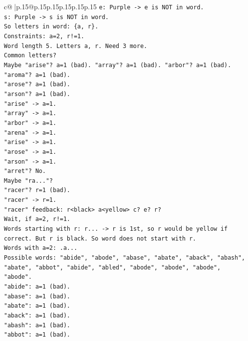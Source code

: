 \documentclass{article}
\begin{document}
{\begin{supertabular}{c@{$\;$}|p{.15\linewidth}@{}p{.15\linewidth}p{.15\linewidth}p{.15\linewidth}p{.15\linewidth}p{.15\linewidth}}
{{{\texttt{e: Purple {-}> e is NOT in word.} \\
\texttt{s: Purple {-}> s is NOT in word.} \\
\texttt{So letters in word: \{a, r\}.} \\
\texttt{Constraints: a=2, r!=1.} \\
\texttt{Word length 5. Letters a, r. Need 3 more.} \\
\texttt{Common letters?} \\
\texttt{Maybe "arise"? a=1 (bad). "array"? a=1 (bad). "arbor"? a=1 (bad).} \\
\texttt{"aroma"? a=1 (bad).} \\
\texttt{"arose"? a=1 (bad).} \\
\texttt{"arson"? a=1 (bad).} \\
\texttt{"arise" {-}> a=1.} \\
\texttt{"array" {-}> a=1.} \\
\texttt{"arbor" {-}> a=1.} \\
\texttt{"arena" {-}> a=1.} \\
\texttt{"arise" {-}> a=1.} \\
\texttt{"arose" {-}> a=1.} \\
\texttt{"arson" {-}> a=1.} \\
\texttt{"arret"? No.} \\
\texttt{Maybe "ra..."?} \\
\texttt{"racer"? r=1 (bad).} \\
\texttt{"racer" {-}> r=1.} \\
\texttt{"racer" feedback: r<black> a<yellow> c? e? r?} \\
\texttt{Wait, if a=2, r!=1.} \\
\texttt{Words starting with r: r... {-}> r is 1st, so r would be yellow if correct. But r is black. So word does not start with r.} \\
\texttt{Words with a=2: .a...} \\
\texttt{Possible words: "abide", "abode", "abase", "abate", "aback", "abash", "abate", "abbot", "abide", "abled", "abode", "abode", "abode", "abode".} \\
\texttt{"abide": a=1 (bad).} \\
\texttt{"abase": a=1 (bad).} \\
\texttt{"abate": a=1 (bad).} \\
\texttt{"aback": a=1 (bad).} \\
\texttt{"abash": a=1 (bad).} \\
\texttt{"abbot": a=1 (bad).} \\
}}}
\end{supertabular}}
\end{document}
